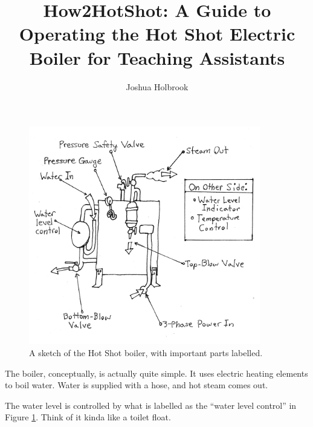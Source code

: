 \documentclass[12pt, letterpaper]{article}
\title{How2HotShot: A Guide to Operating the Hot Shot Electric Boiler for Teaching Assistants}
\author{Joshua Holbrook}
\begin{document}
\maketitle

\begin{figure}
\label{fig:boiler}
\includegraphics[width=0.9\textwidth]{boiler}
\caption{A sketch of the Hot Shot boiler, with important parts labelled.}
\end{figure}

The boiler, conceptually, is actually quite simple. It uses electric heating elements to boil water. Water is supplied with a hose, and hot steam comes out.

The water level is controlled by what is labelled as the ``water level control'' in Figure \ref{fig:boiler}. Think of it kinda like a toilet float.
\end{document}
